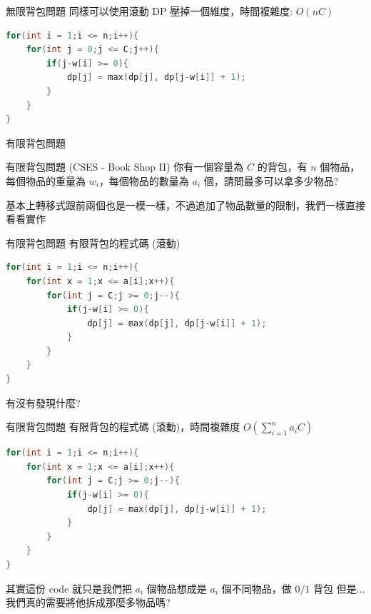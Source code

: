 \documentclass[aspectratio=169]{beamer}
\begin{document}
\begin{frame}[fragile]{無限背包問題}
    同樣可以使用滾動 DP 壓掉一個維度，時間複雜度: $O(nC)$
    \begin{center}
        \begin{lstlisting}[language=C++]
for(int i = 1;i <= n;i++){
    for(int j = 0;j <= C;j++){
        if(j-w[i] >= 0){
            dp[j] = max(dp[j], dp[j-w[i]] + 1);
        }
    }
}
        \end{lstlisting}
    \end{center}
\end{frame} 

\begin{frame}[fragile]{有限背包問題}
    \begin{block}{有限背包問題 (CSES - Book Shop II)}
        你有一個容量為 $C$ 的背包，有 $n$ 個物品，每個物品的重量為 $w_i$，每個物品的數量為 $a_i$ 個，請問最多可以拿多少物品?
    \end{block} 
    基本上轉移式跟前兩個也是一模一樣，不過追加了物品數量的限制，我們一樣直接看看實作
\end{frame} 


\begin{frame}[fragile]{有限背包問題}
    有限背包的程式碼 (滾動)
    \begin{center}
        \begin{lstlisting}[language=C++]
for(int i = 1;i <= n;i++){
    for(int x = 1;x <= a[i];x++){
        for(int j = C;j >= 0;j--){
            if(j-w[i] >= 0){
                dp[j] = max(dp[j], dp[j-w[i]] + 1);
            }
        }
    }
}
        \end{lstlisting}
    \end{center}
    有沒有發現什麼?
\end{frame} 

\begin{frame}[fragile]{有限背包問題}
    有限背包的程式碼 (滾動)，時間複雜度 $O(\sum_{i=1}^n a_i C)$
    \begin{center}
        \begin{lstlisting}[language=C++]
for(int i = 1;i <= n;i++){
    for(int x = 1;x <= a[i];x++){
        for(int j = C;j >= 0;j--){
            if(j-w[i] >= 0){
                dp[j] = max(dp[j], dp[j-w[i]] + 1);
            }
        }
    }
}
        \end{lstlisting}
    \end{center}
    其實這份 code 就只是我們把 $a_i$ 個物品想成是 $a_i$ 個不同物品，做 $0/1$ 背包 \pause
    但是... 我們真的需要將他拆成那麼多物品嗎? 
\end{frame} 
\end{document}
